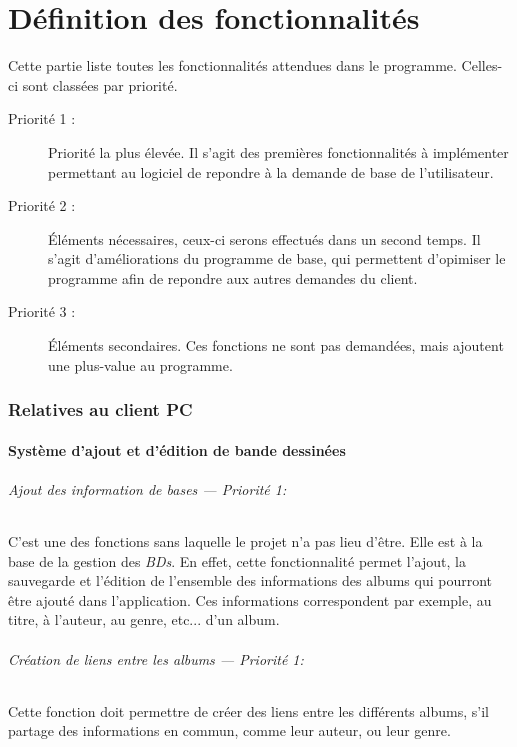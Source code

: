 \part{Définition des fonctionnalités}
Cette partie liste toutes les fonctionnalités attendues dans le programme. Celles-ci sont classées par priorité.

\begin{description}
\item [Priorité 1 :]
	Priorité la plus élevée. Il s'agit des premières fonctionnalités à implémenter permettant au logiciel de repondre à la demande de base de l'utilisateur.

\item [Priorité 2 :]
	Éléments nécessaires, ceux-ci serons effectués dans un second temps. Il s'agit d'améliorations du programme de base, qui permettent d'opimiser le programme afin de repondre aux autres demandes du client.  

\item [Priorité 3 :]
	Éléments secondaires. Ces fonctions ne sont pas demandées, mais ajoutent une plus-value au programme. 
\end{description}


\section{Relatives au client PC}

\subsection{Système d'ajout et d'édition de bande dessinées}
\paragraph{Ajout des information de bases ---  \textit{Priorité 1}:}
C'est une des fonctions sans laquelle le projet n'a pas lieu d'être. Elle est à la base de la gestion des \emph{BDs}. En effet, cette fonctionnalité permet l'ajout, la sauvegarde et l'édition de l'ensemble des informations des albums qui pourront être ajouté dans l'application. Ces informations correspondent par exemple, au titre, à l'auteur, au genre, etc... d'un album.

\paragraph{Création de liens entre les albums ---  \textit{Priorité 1}:}  
Cette fonction doit permettre de créer des liens entre les différents albums, s'il partage des informations en commun, comme leur auteur, ou leur genre.

